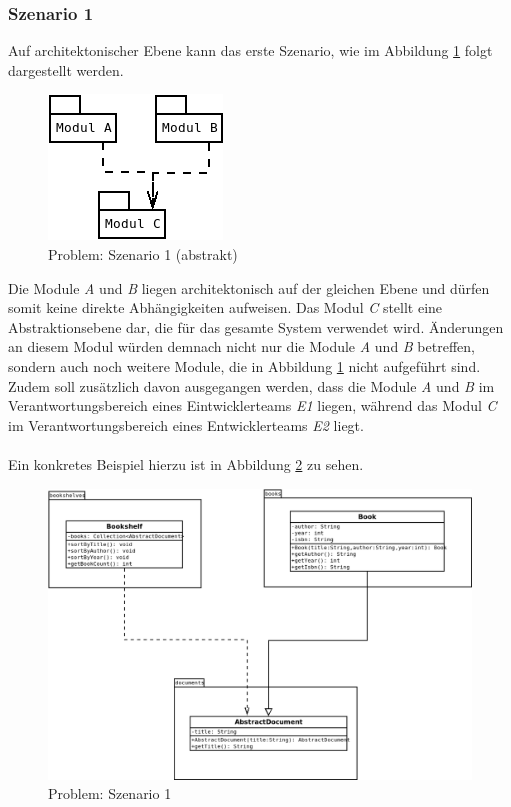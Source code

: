 \documentclass[11pt, 
ngerman,
doublespacing,
chapterinoneline, %
consistentlayout, %
]{scrartcl}
\begin{document}
\subsubsection{Szenario 1}
Auf architektonischer Ebene kann das erste Szenario, wie im Abbildung \ref{fig:problem} folgt dargestellt werden.
\begin{figure}[h]
  \centering
  \includegraphics[scale = 0.7]{pics/problemS1Abstrakt.png}
  \caption{Problem: Szenario 1 (abstrakt)}
  \label{fig:problem}
\end{figure}
Die Module \emph{A} und \emph{B} liegen architektonisch auf der gleichen Ebene und dürfen somit keine direkte Abhängigkeiten aufweisen. Das Modul \emph{C} stellt eine Abstraktionsebene dar, die für das gesamte System verwendet wird. Änderungen an diesem Modul würden demnach nicht nur die Module \emph{A} und \emph{B} betreffen, sondern auch noch weitere Module, die in Abbildung \ref{fig:problem} nicht aufgeführt sind. Zudem soll zusätzlich davon ausgegangen werden, dass die Module \emph{A} und \emph{B} im Verantwortungsbereich eines Eintwicklerteams \emph{E1} liegen, während das Modul \emph{C} im Verantwortungsbereich eines Entwicklerteams \emph{E2} liegt.\\\\
Ein konkretes Beispiel hierzu ist in Abbildung \ref{fig:problem1Konkret} zu sehen.
\begin{figure}[h]
  \centering
  \includegraphics[scale = 0.3]{pics/problemS1Konkret.png}
  \caption{Problem: Szenario 1}
  \label{fig:problem1Konkret}
\end{figure}\\
\end{document}
